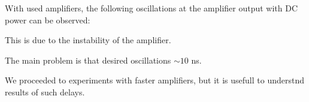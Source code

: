 With used amplifiers, the following oscillations at the amplifier output with DC power can be observed:

\begin{center}
\end{center}

This is due to the instability of the amplifier. 

\phantom{42}

The main problem is that desired oscillations $\sim 10$ ns. \\

\phantom{42}

We proceeded to experiments with faster amplifiers, but it is usefull to understnd results of such delays.




